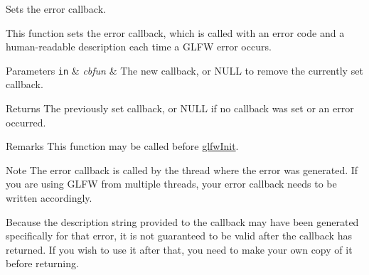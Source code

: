 Sets the error callback. 

This function sets the error callback, which is called with an error code and a human-\/readable description each time a G\-L\-F\-W error occurs.


\begin{DoxyParams}[1]{Parameters}
\mbox{\tt in}  & {\em cbfun} & The new callback, or {\ttfamily N\-U\-L\-L} to remove the currently set callback. \\
\hline
\end{DoxyParams}
\begin{DoxyReturn}{Returns}
The previously set callback, or {\ttfamily N\-U\-L\-L} if no callback was set or an error occurred.
\end{DoxyReturn}
\begin{DoxyRemark}{Remarks}
This function may be called before \hyperlink{group__init_gab41771f0215a2e0afb4cf1cf98082d40}{glfw\-Init}.
\end{DoxyRemark}
\begin{DoxyNote}{Note}
The error callback is called by the thread where the error was generated. If you are using G\-L\-F\-W from multiple threads, your error callback needs to be written accordingly.

Because the description string provided to the callback may have been generated specifically for that error, it is not guaranteed to be valid after the callback has returned. If you wish to use it after that, you need to make your own copy of it before returning. 
\end{DoxyNote}

